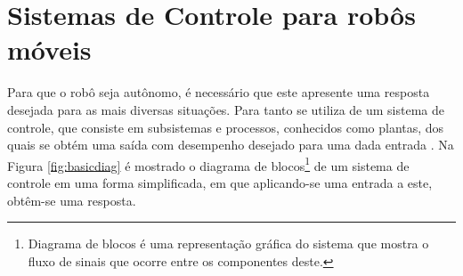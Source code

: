 \vspace{1cm}
\section{Sistemas de Controle para robôs móveis} \label{cap:controle}

Para que o robô seja autônomo, 
é necessário que este apresente uma resposta desejada para 
as mais diversas situações. 
Para tanto se utiliza de um sistema de controle, que consiste em subsistemas e processos, conhecidos como plantas, 
dos quais se obtém uma saída com desempenho desejado para uma dada entrada \cite{nise}. Na Figura 
\ref{fig:basicdiag} é mostrado o diagrama de blocos\footnote{Diagrama de blocos é uma representação gráfica do sistema que mostra o 
fluxo de sinais que ocorre entre os componentes deste.} de 
um sistema de controle em uma forma simplificada, em que aplicando-se uma entrada a este, obtêm-se uma 
resposta. 

